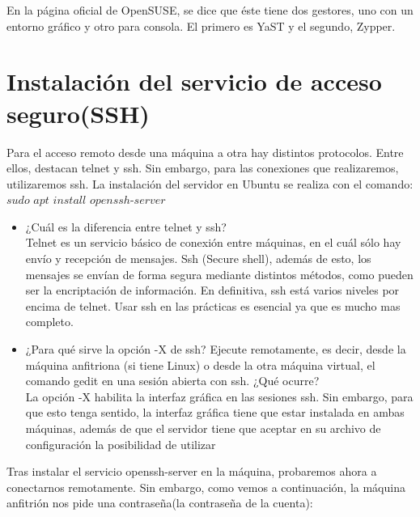 En la página oficial de OpenSUSE\cite{opensuse}, se dice que éste tiene dos gestores, uno con un entorno gráfico y otro para consola. El primero es YaST y el segundo, Zypper.

\newpage
\section{Instalación del servicio de acceso seguro(SSH)}
 
 Para el acceso remoto desde una máquina a otra hay distintos protocolos. Entre ellos, destacan telnet y ssh. Sin embargo, para las conexiones que realizaremos, utilizaremos ssh. La instalación del servidor en Ubuntu se realiza con el comando:\\
 
 $sudo$ $apt$ $install$ $openssh$-$server$\\
 
 
 \begin{itemize}
 	\item ¿Cuál es la diferencia entre telnet y ssh?\\
 	Telnet es un servicio básico de conexión entre máquinas, en el cuál sólo hay envío y recepción de mensajes. Ssh (Secure shell), además de esto, los mensajes se envían de forma segura mediante distintos métodos, como pueden ser la encriptación de información. En definitiva, ssh está varios niveles por encima de telnet. Usar ssh en las prácticas es esencial ya que es mucho mas completo.
 	
 	\item ¿Para qué sirve la opción -X de ssh? Ejecute remotamente, es decir, desde la máquina anfitriona (si tiene Linux) o desde la otra máquina virtual, el comando gedit en una sesión abierta con ssh. ¿Qué ocurre?\\
 	
 	La opción -X habilita la interfaz gráfica en las sesiones ssh. Sin embargo, para que esto tenga sentido, la interfaz gráfica tiene que estar instalada en ambas máquinas, además de que el servidor tiene que aceptar en su archivo de configuración\cite{ssh_config} la posibilidad de utilizar 
 	
 \end{itemize}
 
 Tras instalar el servicio openssh-server en la máquina, probaremos ahora a conectarnos remotamente. Sin embargo, como vemos a continuación, la máquina anfitrión nos pide una contraseña(la contraseña de la cuenta):\\
 
